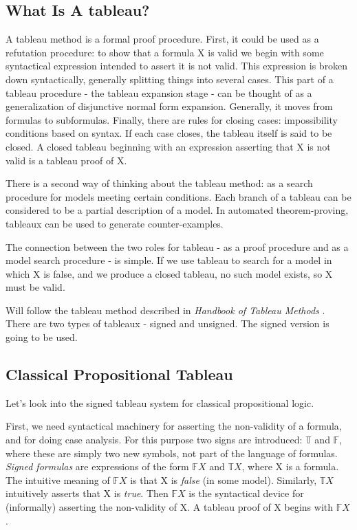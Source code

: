 \documentclass{article}
\newcommand\ST{\mathbb{T}}
\newcommand\SF{\mathbb{F}}
\begin{document}
	\subsection{What Is A tableau?}
	A tableau method is a formal proof procedure. First, it could be used as a refutation procedure: to show that a formula X is valid we begin with some syntactical expression intended to assert it is not valid. This expression is broken down syntactically, generally splitting things into several cases. This part of a tableau procedure - the tableau expansion stage - can be thought of as a generalization of disjunctive normal form expansion. Generally, it moves from formulas to subformulas. Finally, there are rules for closing cases: impossibility conditions based on syntax. If each case closes, the tableau itself is said to be closed. A closed tableau beginning with an expression asserting that X is not valid is a tableau proof of X.
	\par
	There is a second way of thinking about the tableau method: as a search procedure for models meeting certain conditions. Each branch of a tableau can be considered to be a partial description of a model. In automated theorem-proving, tableaux can be used to generate counter-examples.
	\par
	The connection between the two roles for tableau - as a proof procedure and as a model search procedure - is simple. If we use tableau to search for a model in which X is false, and we produce a closed tableau, no such model exists, so X must be valid.

	\par
	Will follow the tableau method described in \textit{Handbook of Tableau Methods} \cite{Handbook-of-Tableau-Methods} . There are two types of tableaux - signed and unsigned. The signed version is going to be used.

	\subsection{Classical Propositional Tableau}
	Let's look into the signed tableau system for classical propositional logic.

	\par
	First, we need syntactical machinery for asserting the non-validity of a formula, and for doing case analysis. For this purpose two signs are introduced: $\ST$ and $\SF$, where these are simply two new symbols, not part of the language of formulas. \textit{Signed formulas} are expressions of the form $\SF X$ and $\ST X$, where X is a formula. The intuitive meaning of $\SF X$ is that X is \textit{false} (in some model). Similarly, $\ST X$ intuitively asserts that X is \textit{true}. Then $\SF X$ is the syntactical device for (informally) asserting the non-validity of X. A tableau proof of X begins with $\SF X$.
\end{document}
